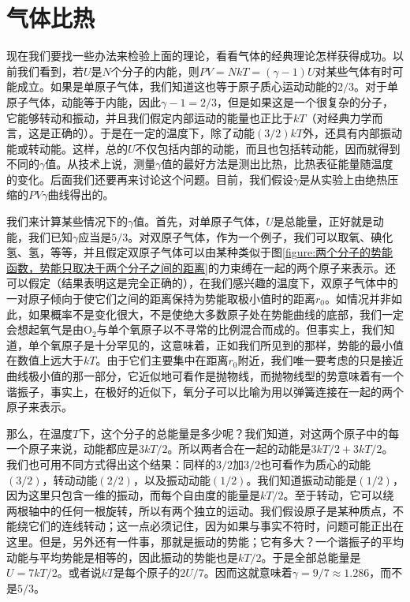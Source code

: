 \section{气体比热}

现在我们要找一些办法来检验上面的理论，看看气体的经典理论怎样获得成功。以前我们看到，若$U$是$N$个分子的内能，则$PV=NkT=(\gamma-1)U$对某些气体有时可能成立。如果是单原子气体，我们知道这也等于原子质心运动动能的$2/3$。对于单原子气体，动能等于内能，因此$\gamma-1=2/3$，但是如果这是一个很复杂的分子，它能够转动和振动，并且我们假定内部运动的能量也正比于$kT$（对经典力学而言，这是正确的）。于是在一定的温度下，除了动能$(3/2)kT$外，还具有内部振动能或转动能。这样，总的$U$不仅包括内部的动能，而且也包括转动能，因而就得到不同的$\gamma$值。从技术上说，测量$\gamma$值的最好方法是测出比热，比热表征能量随温度的变化。后面我们还要再来讨论这个问题。目前，我们假设$\gamma$是从实验上由绝热压缩的$PV\gamma$曲线得出的。

我们来计算某些情况下的$\gamma$值。首先，对单原子气体，$U$是总能量，正好就是动能，我们已知$\gamma$应当是$5/3$。对双原子气体，作为一个例子，我们可以取氧、碘化氢、氢，等等，并且假定双原子气体可以由某种类似于图\ref{figure:两个分子的势能函数，势能只取决于两个分子之间的距离}的力束缚在一起的两个原子来表示。还可以假定（结果表明这是完全正确的），在我们感兴趣的温度下，双原子气体中的一对原子倾向于使它们之间的距离保持为势能取极小值时的距离$r_0$。如情况并非如此，如果概率不是变化很大，不是使绝大多数原子处在势能曲线的底部，我们一定会想起氧气是由O$_2$与单个氧原子以不寻常的比例混合而成的。但事实上，我们知道，单个氧原子是十分罕见的，这意味着，正如我们所见到的那样，势能的最小值在数值上远大于$kT$。由于它们主要集中在距离$r_0$附近，我们唯一要考虑的只是接近曲线极小值的那一部分，它近似地可看作是抛物线，而抛物线型的势意味着有一个谐振子，事实上，在极好的近似下，氧分子可以比喻为用以弹簧连接在一起的两个原子来表示。

那么，在温度$T$下，这个分子的总能量是多少呢？我们知道，对这两个原子中的每一个原子来说，动能都应是$3kT/2$。所以两者合在一起的动能是$3kT/2+3kT/2$。我们也可用不同方式得出这个结果：同样的$3/2$加$3/2$也可看作为质心的动能$(3/2)$，转动动能$(2/2)$，以及振动动能$(1/2)$。我们知道振动动能是$(1/2)$，因为这里只包含一维的振动，而每个自由度的能量是$kT/2$。至于转动，它可以绕两根轴中的任何一根旋转，所以有两个独立的运动。我们假设原子是某种质点，不能绕它们的连线转动；这一点必须记住，因为如果与事实不符时，问题可能正出在这里。但是，另外还有一件事，那就是振动的势能；它有多大？一个谐振子的平均动能与平均势能是相等的，因此振动的势能也是$kT/2$。于是全部总能量是$U=7kT/2$。或者说$kT$是每个原子的$2U/7$。因而这就意味着$\gamma=9/7\approx 1.286$，而不是$5/3$。

